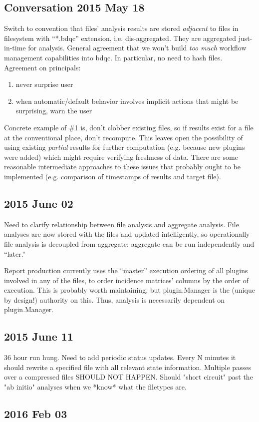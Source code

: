 \documentclass {article}
\begin{document}
\subsection{Conversation 2015 May 18}
Switch to convention that files' analysis results are stored \emph{adjacent}
to files in filesystem with ``*.bdqc'' extension, i.e. dis-aggregated.
They are aggregated just-in-time for analysis.
General agreement that we won't build \emph{too much} workflow management
capabilities into bdqc. In particular, no need to hash files.
Agreement on principals:
\begin{enumerate}
\item never surprise user
\item when automatic/default behavior involves implicit actions that might
be surprising, warn the user
\end{enumerate}
Concrete example of \#1 is, don't clobber existing files, so if results
exist for a file at the conventional place, don't recompute. This leaves
open the possibility of using existing \emph{partial} results for further
computation (e.g. because new plugins were added) which might require
verifying freshness of data. There are some reasonable intermediate
approaches to these issues that probably ought to be implemented (e.g.
comparison of timestamps of results and target file).

\subsection{2015 June 02}
Need to clarify relationship between file analysis and aggregate analysis.
File analyses are now stored with the files and updated intelligently, so
operationally file analysis is decoupled from aggregate: aggregate can be
run independently and ``later.''

Report production currently uses the ``master'' execution ordering of all
plugins involved in any of the files, to order incidence matrices' columns
by the order of execution. This is probably worth maintaining, but
plugin.Manager is the (unique by design!) authority on this. Thus, analysis
is necessarily dependent on plugin.Manager.

\subsection{2015 June 11}
36 hour run hung.
Need to add periodic status updates. Every N minutes it should rewrite
a specified file with all relevant state information.
Multiple passes over a compressed files SHOULD NOT HAPPEN.
Should "short circuit" past the "ab initio" analyses when we *know* what
the filetypes are.

\subsection{2016 Feb 03}
\end{document}
